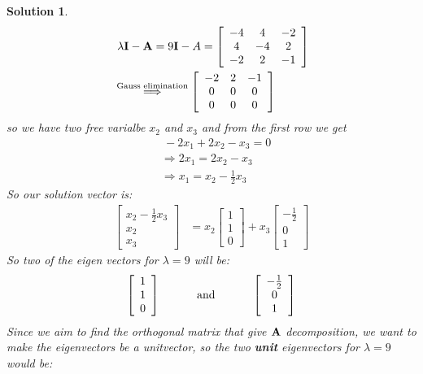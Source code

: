 \documentclass[11pt]{article}\usepackage[]{graphicx}\usepackage[]{color}
\newtheorem{sol}{Solution}
\begin{document}
\begin{sol}
\begin{align*}
		&\ \lambda{\bf I} - {\bf A} = 9{\bf I} - A = \left[\begin{array}{ccc} -4& 4&-2\\ 4&-4&2 \\ -2&2&-1 \end{array}\right]\\
		&\stackrel{\text{Gauss elimination}}{\Longrightarrow} \left[\begin{array}{ccc} -2&2&-1 \\0 &0&0\\0&0&0 \end{array}\right]
	\end{align*}
	so we have two free varialbe $x_2$ and $x_3$ and from the first row we get 
	\begin{align*}
		&\ -2x_1 + 2x_2 - x_3 = 0\\
		&\Longrightarrow 2x_1 = 2x_2 - x_3\\
		&\Longrightarrow x_1 = x_2 - \frac{1}{2}x_3
	\end{align*}
	So our solution vector is:
	\begin{align*}
		\left[\begin{array}{c} x_2 - \frac{1}{2}x_3\\ x_2\\ x_3\end{array}\right] &= x_2\left[\begin{array}{c} 1\\ 1\\ 0\end{array}\right] + x_3\left[\begin{array}{c} -\frac{1}{2}\\ 0\\1 \end{array}\right]
	\end{align*}
	So two of the eigen vectors for $\lambda = 9$ will be:
	\begin{align*}
		\left[\begin{array}{c} 1\\ 1\\  0\end{array}\right]\hskip 1cm \text{ and }\hskip 1cm \left[\begin{array}{c} -\frac{1}{2}\\ 0\\ 1\end{array}\right]
	\end{align*}
	Since we aim to find the orthogonal matrix that give ${\bf A}$ decomposition, we want to make the eigenvectors be a unitvector, so the two {\bf unit} eigenvectors for $\lambda =9$ would be:

\end{sol}
\end{document}
